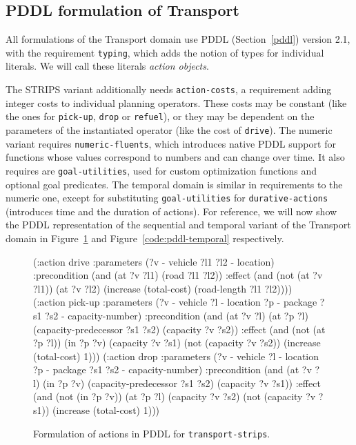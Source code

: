 \subsection{PDDL formulation of Transport}

All formulations of the Transport domain use PDDL (Section~\ref{pddl}) version 2.1,
with the requirement \verb+typing+, which adds the notion of types for individual
literals. We will call these literals \textit{action objects}.

The STRIPS variant additionally needs \verb+action-costs+, a requirement adding
integer costs to individual planning operators. These costs may be constant
(like the ones for \verb+pick-up+, \verb+drop+ or \verb+refuel+),
or they may be dependent on the parameters of the instantiated operator (like
the cost of \verb+drive+).
The numeric variant
requires \verb+numeric-fluents+, which introduces native PDDL support for functions whose values correspond to numbers and can change over time. It also requires are
\verb+goal-utilities+, used for custom optimization functions and optional goal predicates.
The temporal domain is similar in requirements to the numeric one, except for
substituting \verb+goal-utilities+ for \verb+durative-actions+ (introduces time
and the duration of actions).
For reference, we will now show the PDDL representation of the sequential and temporal variant of
the Transport domain in Figure~\ref{code:pddl-strips} and Figure~\ref{code:pddl-temporal} respectively.

\begin{figure}[tbp]
\begin{code}
(:action drive
  :parameters (?v - vehicle ?l1 ?l2 - location)
  :precondition (and
      (at ?v ?l1)
      (road ?l1 ?l2))
  :effect (and
      (not (at ?v ?l1))
      (at ?v ?l2)
      (increase (total-cost) (road-length ?l1 ?l2))))
(:action pick-up
  :parameters (?v - vehicle ?l - location ?p - package
               ?s1 ?s2 - capacity-number)
  :precondition (and
      (at ?v ?l)
      (at ?p ?l)
      (capacity-predecessor ?s1 ?s2)
      (capacity ?v ?s2))
  :effect (and
      (not (at ?p ?l))
      (in ?p ?v)
      (capacity ?v ?s1)
      (not (capacity ?v ?s2))
      (increase (total-cost) 1)))
(:action drop
  :parameters (?v - vehicle ?l - location ?p - package
               ?s1 ?s2 - capacity-number)
  :precondition (and
      (at ?v ?l)
      (in ?p ?v)
      (capacity-predecessor ?s1 ?s2)
      (capacity ?v ?s1))
  :effect (and
      (not (in ?p ?v))
      (at ?p ?l)
      (capacity ?v ?s2)
      (not (capacity ?v ?s1))
      (increase (total-cost) 1)))
\end{code}
\caption{Formulation of actions in PDDL for \texttt{transport-strips}.}
\label{code:pddl-strips}
\end{figure}

